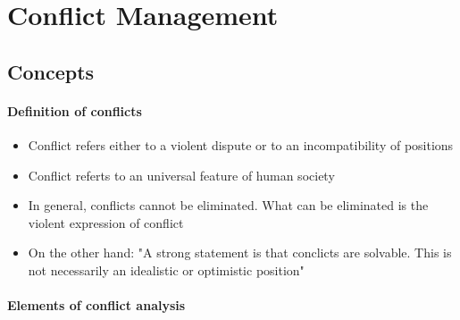 \section{Conflict Management}

\subsection{Concepts}

\paragraph{Definition of conflicts}

\begin{itemize}
    \item Conflict refers either to a violent dispute or to an incompatibility
        of positions
    \item Conflict referts to an universal feature of human society
    \item In general, conflicts cannot be eliminated. What can be eliminated
        is the violent expression of conflict
    \item On the other hand: "A strong statement is that conclicts are solvable.
        This is not necessarily an idealistic or optimistic position"
\end{itemize}

\paragraph{Elements of conflict analysis}

